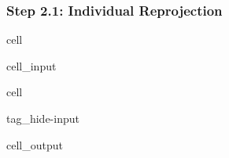 \documentclass[letterpaper,10pt,english]{jupyterBook}
\begin{document}
\subsubsection{Step 2.1: Individual Reprojection}
\label{\detokenize{algorithm/CIMR_L2_TSA_PICASSO:step-2-1-individual-reprojection}}
\begin{sphinxuseclass}{cell}\begin{sphinxVerbatimInput}

\begin{sphinxuseclass}{cell_input}
\begin{sphinxVerbatim}[commandchars=\\\{\}]
  
  
\end{sphinxVerbatim}

\end{sphinxuseclass}\end{sphinxVerbatimInput}

\end{sphinxuseclass}
\begin{sphinxuseclass}{cell}
\begin{sphinxuseclass}{tag_hide-input}\begin{sphinxVerbatimOutput}

\begin{sphinxuseclass}{cell_output}
\noindent{}

\end{sphinxuseclass}\end{sphinxVerbatimOutput}

\end{sphinxuseclass}
\end{sphinxuseclass}
\end{document}
